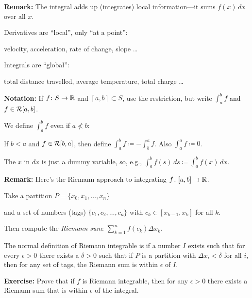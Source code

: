 \documentclass[10pt,aspectratio=169]{beamer}
\begin{document}
\begin{frame}

\textbf{Remark:}
The integral adds up (integrates) local information---it sums $f(x)\,dx$ over all $x$.

\pause
\medskip

Derivatives are ``local'', only ``at a point'':

velocity, acceleration, rate of change,
slope \ldots

\pause
\medskip

Integrals are ``global'':

total distance travelled, average temperature,
total charge \ldots

\pause
\medskip

\textbf{Notation:}
If $f \colon S \to {\mathbb{R}}$ and $[a,b] \subset S$,
use the restriction, but write $\int_a^b f$ and $f \in {\mathcal{R}}[a,b]$.

\pause
\medskip

We define $\int_a^b f$ even if $a \not< b$:

\pause
\medskip

If $b < a$ and $f \in {\mathcal{R}}[b,a]$,
then define
\quad
$\displaystyle
\int_a^b f \coloneqq - \int_b^a f$.
\quad
\pause
Also
\quad
$\displaystyle
\int_a^a f \coloneqq 0$.

\pause
\medskip

The $x$ in $dx$ is just a dummy variable,
so, e.g.,
\quad
$\displaystyle
\int_a^b f(s)\,ds \coloneqq \int_a^b f(x)\,dx$.

\end{frame}

\begin{frame}

\textbf{Remark:}
Here's the Riemann approach to integrating
$f \colon [a,b] \to {\mathbb{R}}$.

\pause
Take a partition
$P = \{ x_0, x_1, \ldots, x_n \}$

\pause
and a set of numbers (tags) $\{ c_1, c_2, \ldots, c_n \}$ with
$c_k \in [x_{k-1},x_k]$ for all $k$.

\pause
Then compute the \emph{Riemann sum}:
\quad
$\displaystyle
\sum_{k=1}^n f(c_k) \Delta x_k$.

\pause
\medskip

The normal definition of Riemann integrable is if a number $I$
exists such that for every $\epsilon > 0$ there exists a
$\delta > 0$ such that if $P$ is a partition with $\Delta x_i < \delta$
for all $i$, then for any set of tags,
the Riemann sum is within $\epsilon$ of $I$.

\pause
\medskip

\textbf{Exercise:}
Prove that if $f$ is Riemann integrable, then for any $\epsilon > 0$
there exists a Riemann sum that is within $\epsilon$ of the integral.

\end{frame}
\end{document}
